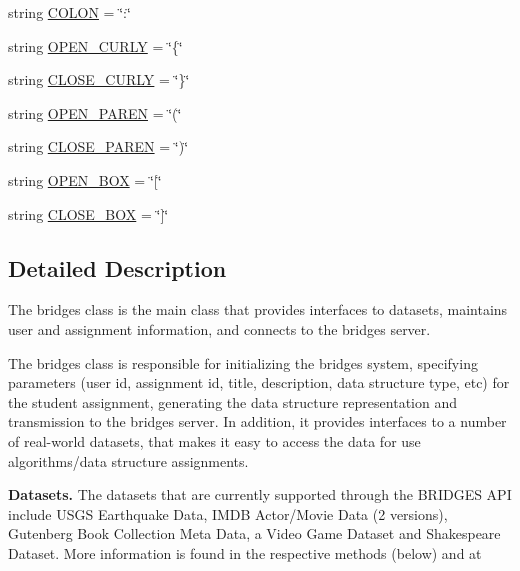 \begin{DoxyCompactItemize}
\item 
string \mbox{\hyperlink{class_bridges_1_1bridges_1_1_bridges_abfa62a66fca4dae2fe727a590a284f6b}{C\+O\+L\+ON}} = \char`\"{}\+:\char`\"{}
\item 
string \mbox{\hyperlink{class_bridges_1_1bridges_1_1_bridges_a2553c7dc637582bfd38998ee5c2a7f2b}{O\+P\+E\+N\+\_\+\+C\+U\+R\+LY}} = \char`\"{}\{\char`\"{}
\item 
string \mbox{\hyperlink{class_bridges_1_1bridges_1_1_bridges_ac4c7b26ef4e060229b1449ab73500cfb}{C\+L\+O\+S\+E\+\_\+\+C\+U\+R\+LY}} = \char`\"{}\}\char`\"{}
\item 
string \mbox{\hyperlink{class_bridges_1_1bridges_1_1_bridges_a1cd80e923a43de668fe44b606264b290}{O\+P\+E\+N\+\_\+\+P\+A\+R\+EN}} = \char`\"{}(\char`\"{}
\item 
string \mbox{\hyperlink{class_bridges_1_1bridges_1_1_bridges_a0b250d3bfad480552ff46884310ac6d1}{C\+L\+O\+S\+E\+\_\+\+P\+A\+R\+EN}} = \char`\"{})\char`\"{}
\item 
string \mbox{\hyperlink{class_bridges_1_1bridges_1_1_bridges_ae766e7f43cc4c93ff14abff689aa6612}{O\+P\+E\+N\+\_\+\+B\+OX}} = \char`\"{}\mbox{[}\char`\"{}
\item 
string \mbox{\hyperlink{class_bridges_1_1bridges_1_1_bridges_ae389d89d8512b2c481da3c165cac4c33}{C\+L\+O\+S\+E\+\_\+\+B\+OX}} = \char`\"{}\mbox{]}\char`\"{}
\end{DoxyCompactItemize}


\subsection{Detailed Description}
The bridges class is the main class that provides interfaces to datasets, maintains user and assignment information, and connects to the bridges server. 

The bridges class is responsible for initializing the bridges system, specifying parameters (user id, assignment id, title, description, data structure type, etc) for the student assignment, generating the data structure representation and transmission to the bridges server. In addition, it provides interfaces to a number of real-\/world datasets, that makes it easy to access the data for use algorithms/data structure assignments. ~\newline


{\bfseries Datasets.} The datasets that are currently supported through the B\+R\+I\+D\+G\+ES A\+PI include U\+S\+GS Earthquake Data, I\+M\+DB Actor/\+Movie Data (2 versions), Gutenberg Book Collection Meta Data, a Video Game Dataset and Shakespeare Dataset. More information is found in the respective methods (below) and at 

